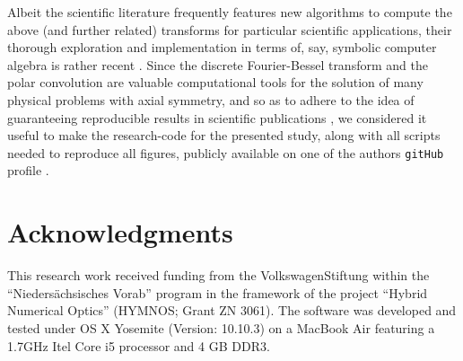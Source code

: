 \documentclass[review]{elsarticle}
\begin{document}
Albeit the scientific literature frequently features new algorithms to compute
the above (and further related) transforms for particular scientific
applications, their thorough exploration and implementation in terms of, say,
symbolic computer algebra is rather recent \cite{Dovlo:2015}.  Since the
discrete Fourier-Bessel transform and the polar convolution are valuable
computational tools for the solution of many physical problems with axial
symmetry, and so as to adhere to the idea of guaranteeing reproducible results
in scientific publications \cite{Sandve:2013,Barnes:2010}, we considered it
useful to make the research-code for the presented study, along with all
scripts needed to reproduce all figures, publicly available on one of the
authors {\tt gitHub} profile \cite{MelchertGitHub_dFBT:2016}.


\section*{Acknowledgments}
This research work received funding from the VolkswagenStiftung within the
``Nieders\"achsisches Vorab'' program in the framework of the project ``Hybrid
Numerical Optics''  (HYMNOS; Grant ZN 3061). The software was developed and 
tested under OS X Yosemite (Version: 10.10.3) on a MacBook Air featuring a
1.7GHz Itel Core i5 processor and 4 GB DDR3.


\end{document}
